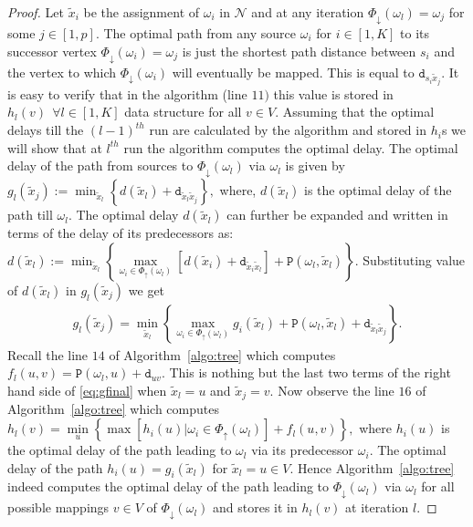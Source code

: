 \documentclass[journal]{IEEEtran}
\newcommand{\net}{\mathcal{N}}
\newcommand{\netnodes}{V}
\newcommand{\prenodes}[1]{\Phi_{\uparrow}(#1)}
\newcommand{\sucnodes}[1]{\Phi_{\downarrow}(#1)}
\newcommand{\distance}{\mathtt{d}} \newcommand{\edgewt}{\mathtt{W}} \newcommand{\processingwt}{\mathtt{P}}
\begin{document}
\begin{proof}
  Let $\tilde{x}_i$ be the assignment of $\omega_i$ in $\net$ and at
  any iteration $\sucnodes{\omega_l} = \omega_j$ for some $j \in
  [1,p].$ The optimal path from any source $\omega_i$ for $i \in
  [1,K]$ to its successor vertex $\sucnodes{\omega_i} = \omega_j$ is
  just the shortest path distance between $s_i$ and the vertex to
  which $\sucnodes{\omega_i}$ will eventually be mapped. This is equal
  to $\distance_{s_i \tilde{x}_j}.$ It is easy to verify that in the
  algorithm (line $11)$ this value is stored in $h_l(v) \ \ \forall l
  \in [1,K]$ data structure for all $v \in \netnodes.$ Assuming that
  the optimal delays till the $(l-1)^{th}$ run are calculated by the
  algorithm and stored in $h_i$s we will show that at $l^{th}$ run the
  algorithm computes the optimal delay. The optimal delay of the path
  from sources to $\sucnodes{\omega_l}$ via $\omega_l$ is given by
  $g_l(\tilde{x}_j) := \min_{\tilde{x}_l} \left\{d(\tilde{x}_l) +
      \distance_{\tilde{x}_l \tilde{x}_j} \right\},$ 
  where, $d(\tilde{x}_l)$ is the optimal delay of the path till
  $\omega_l.$ The optimal delay $d(\tilde{x}_l)$ can further be
  expanded and written in terms of the delay of its predecessors as:
  $d(\tilde{x}_l) := \min_{\tilde{x}_l} \left\{\max\limits_{\omega_i
        \in \prenodes{\omega_l}}[ d(\tilde{x}_i) + \distance_{\tilde{x}_i
        \tilde{x}_l} ]+ \processingwt(\omega_l,\tilde{x}_l) 
    \right\}.$
 Substituting value of $d(\tilde{x}_l)$ in $g_l(\tilde{x}_j)$ we get
\begin{align}
    g_l(\tilde{x}_j) = \min_{\tilde{x}_l} \left\{
      \max\limits_{\omega_i \in \prenodes{\omega_l}}g_i(\tilde{x}_l) +
      \processingwt(\omega_l,\tilde{x}_l) + \distance_{\tilde{x}_l
        \tilde{x}_j} \right\}. \label{eq:gfinal}
  \end{align}
Recall the line $14$ of Algorithm~\ref{algo:tree} which computes
  $f_l(u,v) = \processingwt(\omega_l,u) + \distance_{uv}.$ This is
  nothing but the last two terms of the right hand side of
  \eqref{eq:gfinal} when $\tilde{x}_l = u$ and $\tilde{x}_j = v.$ Now
  observe the line $16$ of Algorithm~\ref{algo:tree} which computes
  $h_l(v) = \min\limits_{u} \left\{\max[h_i(u)|\omega_i \in
    \prenodes{\omega_l}] + f_l(u,v)\right\},$ where $h_i(u)$ is the
  optimal delay of the path leading to $\omega_l$ via its predecessor
  $\omega_i.$ The optimal delay of the path $h_i(u) =
  g_i(\tilde{x}_l)$ for $\tilde{x}_l=u \in \netnodes.$ Hence
  Algorithm~\ref{algo:tree} indeed computes the optimal delay of the
  path leading to $\sucnodes{\omega_l}$ via $\omega_l$ for all
  possible mappings $v \in \netnodes$ of $\sucnodes{\omega_l}$ and
  stores it in $h_l(v)$ at iteration $l.$


\end{proof}
\end{document}
